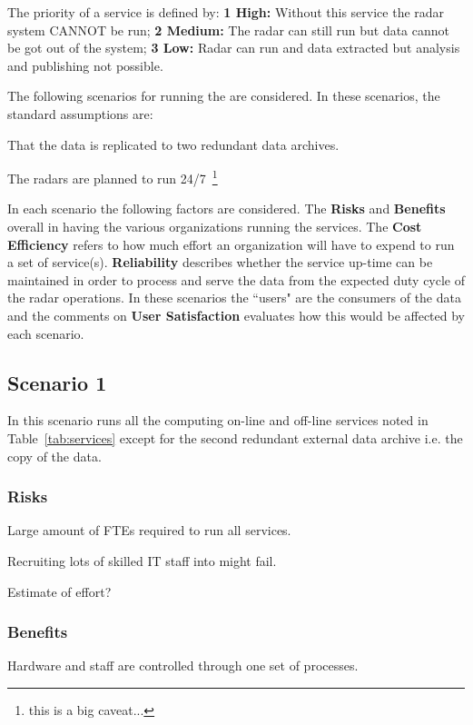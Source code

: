 \documentclass[12pt,a4paper]{article}
\begin{document}
The priority of a service is defined by: {\bf 1 High:} Without this service the radar system CANNOT be run; {\bf 2 Medium:} The radar can still run but data cannot be got out of the system; {\bf 3 Low:} Radar can run and data extracted but analysis and publishing not possible.

The following scenarios for running the \ED \einfra are considered.
In these scenarios, the standard assumptions are:
\bitm
\item That the \ED data is replicated to two redundant data archives.
\item The \ED radars are planned to run 24/7~\footnote{this is a big caveat...}
\eitm

In each scenario the following factors are considered.
The {\bf Risks} and {\bf Benefits} overall in having the various organizations running the services.
The {\bf Cost Efficiency} refers to how much effort an organization will have to expend to run a set of service(s).
{\bf Reliability} describes whether the service up-time can be maintained in order to process and serve the data from the expected duty cycle of the radar operations.
In these scenarios the ``users" are the consumers of the \ED data and the comments on {\bf User Satisfaction} evaluates how this would be affected by each scenario.

\subsection{Scenario 1}

In this scenario \EC runs all the computing on-line and off-line services noted in Table~\ref{tab:services} except for the second redundant external data archive i.e. the copy of the \ED data.

\subsubsection*{Risks}
\bitm
\item Large amount of FTEs required to run all services.
\item Recruiting lots of skilled IT staff into \ESA might fail.
\item Estimate of effort? 
\eitm

\subsubsection*{Benefits}
\bitm
\item Hardware and staff are controlled through one set of \EC processes.
\eitm
\end{document}
